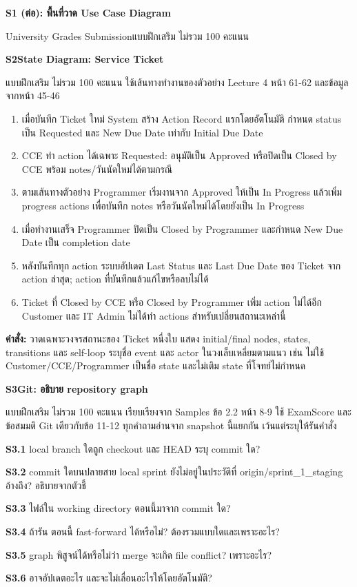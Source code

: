 \blankbox{3.5cm}
\newpage
\textbf{\Large S1 (ต่อ): พื้นที่วาด Use Case Diagram}\par
University Grades Submission\hfill แบบฝึกเสริม ไม่รวม 100 คะแนน\par
\blankbox{21.5cm}
\newpage
\textbf{\Large S2\quad State Diagram: Service Ticket}\par
แบบฝึกเสริม ไม่รวม 100 คะแนน ใช้เส้นทางทำงานของตัวอย่าง Lecture 4 หน้า 61-62 และข้อมูลจากหน้า 45-46\par
\begin{enumerate}[itemsep=2pt]
\item เมื่อบันทึก Ticket ใหม่ System สร้าง Action Record แรกโดยอัตโนมัติ กำหนด status เป็น Requested และ New Due Date เท่ากับ Initial Due Date
\item CCE ทำ action ได้เฉพาะ Requested: อนุมัติเป็น Approved หรือปิดเป็น Closed by CCE พร้อม notes/วันนัดใหม่ได้ตามกรณี
\item ตามเส้นทางตัวอย่าง Programmer เริ่มงานจาก Approved ให้เป็น In Progress แล้วเพิ่ม progress actions เพื่อบันทึก notes หรือวันนัดใหม่ได้โดยยังเป็น In Progress
\item เมื่อทำงานเสร็จ Programmer ปิดเป็น Closed by Programmer และกำหนด New Due Date เป็น completion date
\item หลังบันทึกทุก action ระบบอัปเดต Last Status และ Last Due Date ของ Ticket จาก action ล่าสุด; action ที่บันทึกแล้วแก้ไขหรือลบไม่ได้
\item Ticket ที่ Closed by CCE หรือ Closed by Programmer เพิ่ม action ไม่ได้อีก Customer และ IT Admin ไม่ได้ทำ actions สำหรับเปลี่ยนสถานะเหล่านี้
\end{enumerate}
\textbf{คำสั่ง:} วาดเฉพาะวงจรสถานะของ Ticket หนึ่งใบ แสดง initial/final nodes, states, transitions และ self-loop ระบุชื่อ event และ actor ในวงเล็บเหลี่ยมตามแนว เช่น  ไม่ใช้ Customer/CCE/Programmer เป็นชื่อ state และไม่เติม state ที่โจทย์ไม่กำหนด\par
\blankbox{13cm}
\newpage
\textbf{\Large S3\quad Git: อธิบาย repository graph}\par
แบบฝึกเสริม ไม่รวม 100 คะแนน เรียบเรียงจาก Samples ข้อ 2.2 หน้า 8-9 ใช้ ExamScore และข้อสมมติ Git เดียวกับข้อ 11-12 ทุกคำถามอ่านจาก snapshot นี้แยกกัน เว้นแต่ระบุให้รันคำสั่ง\par
\begin{center}\supplementgitgraph\end{center}
\textbf{S3.1} local branch ใดถูก checkout และ HEAD ระบุ commit ใด?\par
\blankbox{1.5cm}
\textbf{S3.2} commit ใดบนปลายสาย local sprint ยังไม่อยู่ในประวัติที่ origin/sprint\_1\_staging อ้างถึง? อธิบายจากตัวชี้\par
\blankbox{1.8cm}
\textbf{S3.3} ไฟล์ใน working directory ตอนนี้มาจาก commit ใด?\par
\blankbox{1.5cm}
\textbf{S3.4} ถ้ารัน  ตอนนี้ fast-forward ได้หรือไม่? ต้องรวมแบบใดและเพราะอะไร?\par
\blankbox{2cm}
\textbf{S3.5} graph พิสูจน์ได้หรือไม่ว่า merge จะเกิด file conflict? เพราะอะไร?\par
\blankbox{1.5cm}
\textbf{S3.6}  อาจอัปเดตอะไร และจะไม่เลื่อนอะไรให้โดยอัตโนมัติ?\par
\blankbox{2cm}
\fi
